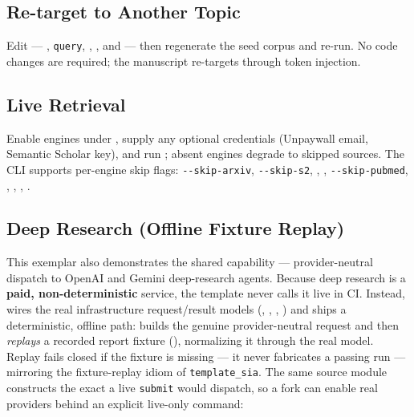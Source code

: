\documentclass[
]{article}
\begin{document}
\subsection{Re-target to Another
Topic}\label{re-target-to-another-topic}

Edit  ---
, \texttt{query},
, , and
 --- then regenerate the seed corpus and
re-run. No code changes are required; the manuscript re-targets through
token injection.

\subsection{Live Retrieval}\label{live-retrieval}

Enable engines under , supply any
optional credentials (Unpaywall email, Semantic Scholar key), and run
; absent engines degrade to
skipped sources. The CLI supports per-engine skip flags:
\texttt{-\/-skip-arxiv}, \texttt{-\/-skip-s2},
, ,
\texttt{-\/-skip-pubmed}, ,
, ,
.

\subsection{Deep Research (Offline Fixture
Replay)}\label{deep-research-offline-fixture-replay}

This exemplar also demonstrates the shared
 capability ---
provider-neutral dispatch to OpenAI and Gemini deep-research agents.
Because deep research is a \textbf{paid, non-deterministic} service, the
template never calls it live in CI. Instead,
 wires the real infrastructure
request/result models (,
, ,
) and ships a deterministic, offline path:
 builds the genuine
provider-neutral request and then \emph{replays} a recorded report
fixture (),
normalizing it through the real  model.
Replay fails closed if the fixture is missing --- it never fabricates a
passing run --- mirroring the fixture-replay idiom of
\texttt{template\_sia}. The same source module constructs the exact
 a live \texttt{submit} would dispatch, so a
fork can enable real providers behind an explicit live-only command:
\end{document}
